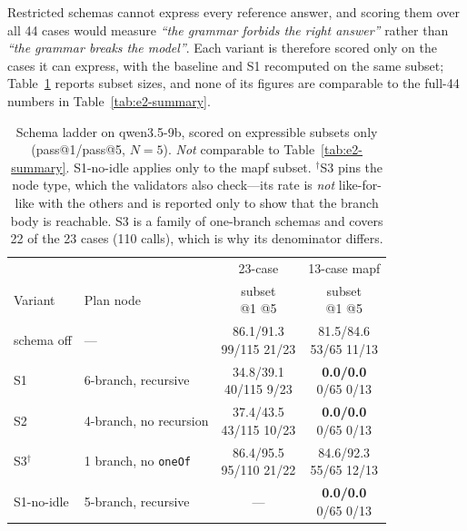 \documentclass[10pt,twocolumn]{article}
\newcommand{\code}[1]{\texttt{\small #1}}
\begin{document}
Restricted schemas cannot express every reference answer, and scoring them
over all 44 cases would measure \emph{``the grammar forbids the right answer''}
rather than \emph{``the grammar breaks the model''}. Each variant is therefore
scored only on the cases it can express, with the baseline and S1 recomputed
on the same subset; Table~\ref{tab:e2-ladder} reports subset sizes, and none
of its figures are comparable to the full-44 numbers in
Table~\ref{tab:e2-summary}.

\begin{table}[t]
\centering\footnotesize
\setlength{\tabcolsep}{4pt}
\caption{Schema ladder on qwen3.5-9b, scored on expressible subsets only
(pass@1/pass@5, $N{=}5$). \emph{Not} comparable to
Table~\ref{tab:e2-summary}. S1-no-idle applies only to the mapf subset.
$^\dagger$S3 pins the node type, which the validators also check---its rate is
\emph{not} like-for-like with the others and is reported only to show that the
branch body is reachable. S3 is a family of one-branch schemas and covers 22
of the 23 cases (110 calls), which is why its denominator differs.}
\label{tab:e2-ladder}
\begin{tabular}{llcc}
\toprule
 & & 23-case & 13-case mapf \\
Variant & Plan node & \makecell{subset\\\scriptsize @1 \textbar{} @5} & \makecell{subset\\\scriptsize @1 \textbar{} @5} \\
\midrule
schema off   & ---                      & \makecell{86.1/91.3\\\scriptsize 99/115 \textbar{} 21/23} & \makecell{81.5/84.6\\\scriptsize 53/65 \textbar{} 11/13} \\
S1           & 6-branch, recursive      & \makecell{34.8/39.1\\\scriptsize 40/115 \textbar{} 9/23} & \makecell{\textbf{0.0/0.0}\\\scriptsize 0/65 \textbar{} 0/13} \\
S2           & 4-branch, no recursion   & \makecell{37.4/43.5\\\scriptsize 43/115 \textbar{} 10/23} & \makecell{\textbf{0.0/0.0}\\\scriptsize 0/65 \textbar{} 0/13} \\
S3$^\dagger$ & 1 branch, no \code{oneOf}& \makecell{86.4/95.5\\\scriptsize 95/110 \textbar{} 21/22} & \makecell{84.6/92.3\\\scriptsize 55/65 \textbar{} 12/13} \\
S1-no-idle   & 5-branch, recursive      & ---       & \makecell{\textbf{0.0/0.0}\\\scriptsize 0/65 \textbar{} 0/13} \\
\bottomrule
\end{tabular}
\end{table}
\end{document}
